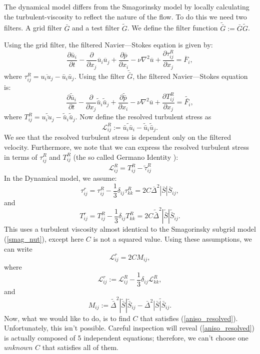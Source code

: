 \documentclass[11pt,a4paper]{article}
\newcommand{\eq}[1]{(\ref{#1})}
\begin{document}
The dynamical model differs from the Smagorinsky model by locally calculating the turbulent-viscosity to reflect the nature of the flow. To do this we need two filters. A grid filter $\bar{G}$ and a test filter $\tilde{G}$. We define the filter function $\tilde{\bar{G}} := \bar{G}\tilde{G}$.

Using the grid filter, the filtered Navier—Stokes eqation is given by:
$$ \frac{\partial \bar{u}_i}{\partial t} - \frac{\partial }{\partial x_j}\overline{u}_i\overline{u}_j+\frac{\partial \overline{p}}{\partial x_i}- \nu \nabla^2 \overline{u} +\frac{\partial \tau_{ij}^R}{\partial x_j}= \overline{F}_i,$$ 
where $\tau_{ij}^R = \overline{u_iu_j}-\bar{u}_i\bar{u}_j$. Using the filter $\tilde{\bar{G}}$, the filtered Navier—Stokes equation is:
$$ \frac{\partial \tilde{\bar{u}}_i}{\partial t} - \frac{\partial }{\partial x_j}\tilde{\bar{u}}_i\tilde{\bar{u}}_j+\frac{\partial \tilde{\bar{p}}}{\partial x_i}- \nu \nabla^2 \overline{u} +\frac{\partial T_{ij}^R}{\partial x_j}= \tilde{\bar{F_i}},$$ 
where $T_{ij}^R = \widetilde{\overline{u_iu_j}}-\tilde{\bar{u}}_i\tilde{\bar{u}}_j$. Now define the resolved turbulent stress as
$$\mathscr{L}_{ij}^R := \widetilde{\bar{u}_i\bar{u}_i} - \tilde{\bar{u}}_i\tilde{\bar{u}}_j.$$
We see that the resolved turbulent stress is dependent only on the filtered velocity. Furthermore, we note that we can express the resolved turbulent stress in terms of $\tau_{ij}^R$ and $T_{ij}^R$ (the so called Germano Identity \cite[p.~621]{Pope2000}):
$$\mathscr{L}_{ij}^R = T_{ij}^R - \tilde{\tau}_{ij}^R$$
In the Dynamical model, we assume:
$$\tau_{ij}^r = \tau_{ij}^R - \frac{1}{3}\delta_{ij}\tau_{kk}^R = 2C\bar{\Delta}^2|\bar{S}|\bar{S}_{ij},$$
and 
$$T_{ij}^r = T_{ij}^R - \frac{1}{3}\delta_{ij}T_{kk}^R = 2C\tilde{\bar{\Delta}}^2|\tilde{\bar{S}}|\tilde{\bar{S}}_{ij}.$$
This uses a turbulent viscosity almost identical to the Smagorinsky subgrid model \eq{smag_nut}, except here $C$ is not a squared value. Using these assumptions, we can write
\begin{equation}\label{aniso_resolved}
\mathscr{L}_{ij}^r=  2C{M}_{ij},
\end{equation}
where 
$$\mathscr{L}_{ij}^r:=\mathscr{L}_{ij}^R - \frac{1}{3}\delta_{ij}\mathscr{L}_{kk}^R,$$
and 
$${M}_{ij} :=\tilde{\bar{\Delta}}^2|\tilde{\bar{S}}|\tilde{\bar{S}}_{ij} - \bar{\Delta}^2\widetilde{|\bar{S}|\bar{S}_{ij}}.$$
Now, what we would like to do, is to find $C$ that satisfies \eq{aniso_resolved}. Unfortunately, this isn't possible. Careful inspection will reveal \eq{aniso_resolved} is actually composed of 5 independent equations; therefore, we can't choose one $unknown$ $C$ that satisfies all of them. 
\end{document}
